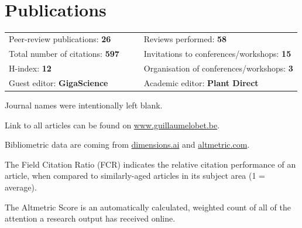 \documentclass[]{friggeri-cv} %
\begin{document}
\newpage
~
\vspace{0.05cm}

\section{Publications}

\vspace{0.5cm}
\vspace{0.5cm}

\begin{tabular}{lp{0.8cm}|p{0.8cm}l}
    
    Peer-review publications: \textbf{26} & & &  Reviews performed: \textbf{58}\\
    Total number of citations: \textbf{597} & & & Invitations to conferences/workshops: \textbf{15}\\
    H-index: \textbf{12} & & & Organisation of conferences/workshops: \textbf{3}\\
   Guest editor: \textbf{GigaScience} & & & Academic editor: \textbf{Plant Direct}\\
\end{tabular}

\vspace{0.5cm}

\small{
    \begin{itemize}
    {\color{lightgray}
        \item Journal names were intentionally left blank.
        \item Link to all articles can be found on \href{http://www.guillaumelobet.be}{www.guillaumelobet.be}.
        \item Bibliometric data are coming from \href{http://www.dimensions.ai}{dimensions.ai} and \href{http://www.altmetric.com}{altmetric.com}.
        \item The Field Citation Ratio (FCR) indicates the relative citation performance of an article, when compared to similarly-aged articles in its subject area (1 = average).
        \item The Altmetric Score is an automatically calculated, weighted count of all of the attention a research output has received online. 
        }   
    \end{itemize}
}

\vspace{0.5cm}
\vspace{0.5cm}

\begin{refsection}
\nocite{*}
\printbibliography[sorting=chronological, type=article, title={Pre-print articles\\}, keyword={preprint}, heading=subbibliography]
\end{refsection}
\end{document}
